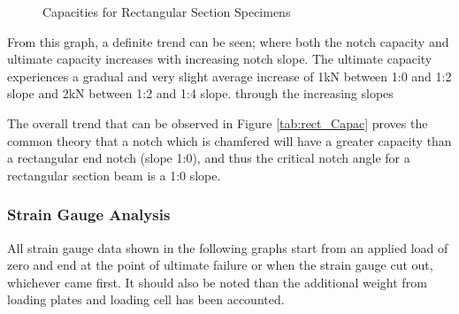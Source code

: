 \documentclass[11pt,a4paper]{article}
\numberwithin{equation}{subsection}
\begin{document}
\begin{figure}[h]
	\begin{center}
	\end{center}
	\caption{Capacities for Rectangular Section Specimens}
	\label{fig:Rect_Spec_Cap}
\end{figure}

\noindent
From this graph, a definite trend can be seen; where both the notch capacity and ultimate capacity increases with increasing notch slope. The ultimate capacity experiences a gradual and very slight average increase of 1kN between 1:0 and 1:2 slope and 2kN between 1:2 and 1:4 slope. through the increasing slopes 

\vspace*{\baselineskip}

\noindent
The overall trend that can be observed in Figure \ref{tab:rect_Capac} proves the common theory that a notch which is chamfered will have a greater capacity than a rectangular end notch (slope 1:0), and thus the critical notch angle for a rectangular section beam is a 1:0 slope.

\subsubsection{Strain Gauge Analysis}
All strain gauge data shown in the following graphs start from an applied load of zero and end at the point of ultimate failure or when the strain gauge cut out, whichever came first. It should also be noted than the additional weight from loading plates and loading cell has been accounted. 

\pagebreak
\end{document}
